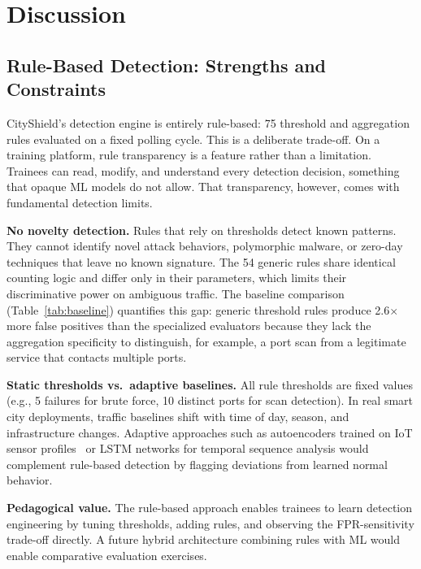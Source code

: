 \documentclass[conference,10pt]{IEEEtran}
\begin{document}
\section{Discussion}
\label{sec:discussion}

\subsection{Rule-Based Detection: Strengths and Constraints}

CityShield's detection engine is entirely rule-based: 75 threshold and aggregation rules evaluated on a fixed polling cycle. This is a deliberate trade-off. On a training platform, rule transparency is a feature rather than a limitation. Trainees can read, modify, and understand every detection decision, something that opaque ML models do not allow. That transparency, however, comes with fundamental detection limits.

\textbf{No novelty detection.} Rules that rely on thresholds detect known patterns. They cannot identify novel attack behaviors, polymorphic malware, or zero-day techniques that leave no known signature. The 54 generic rules share identical counting logic and differ only in their parameters, which limits their discriminative power on ambiguous traffic. The baseline comparison (Table~\ref{tab:baseline}) quantifies this gap: generic threshold rules produce 2.6$\times$ more false positives than the specialized evaluators because they lack the aggregation specificity to distinguish, for example, a port scan from a legitimate service that contacts multiple ports.

\textbf{Static thresholds vs.\ adaptive baselines.} All rule thresholds are fixed values (e.g., 5 failures for brute force, 10 distinct ports for scan detection). In real smart city deployments, traffic baselines shift with time of day, season, and infrastructure changes. Adaptive approaches such as autoencoders trained on IoT sensor profiles~\cite{habibzadeh2019survey} or LSTM networks for temporal sequence analysis would complement rule-based detection by flagging deviations from learned normal behavior.

\textbf{Pedagogical value.} The rule-based approach enables trainees to learn detection engineering by tuning thresholds, adding rules, and observing the FPR-sensitivity trade-off directly. A future hybrid architecture combining rules with ML would enable comparative evaluation exercises.
\end{document}
